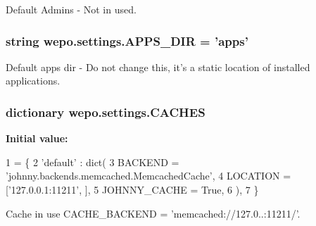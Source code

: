 Default Admins -\/ Not in used. 

\hypertarget{namespacewepo_1_1settings_aa72b0a269f252e5fd99fd29f6fa09db0}{
\subsubsection[{A\-P\-P\-S\-\_\-\-D\-I\-R}]{\setlength{\rightskip}{0pt plus 5cm}string wepo.\-settings.\-A\-P\-P\-S\-\_\-\-D\-I\-R = 'apps'}}\label{namespacewepo_1_1settings_aa72b0a269f252e5fd99fd29f6fa09db0}


Default apps dir -\/ Do not change this, it's a static location of installed applications. 

\hypertarget{namespacewepo_1_1settings_a153ec0e290d7467e4de29f825a3dbe81}{
\subsubsection[{C\-A\-C\-H\-E\-S}]{\setlength{\rightskip}{0pt plus 5cm}dictionary wepo.\-settings.\-C\-A\-C\-H\-E\-S}}\label{namespacewepo_1_1settings_a153ec0e290d7467e4de29f825a3dbe81}
{\bfseries Initial value\-:}
\begin{DoxyCode}
1 = \{
2    \textcolor{stringliteral}{'default'} : dict(
3       BACKEND = \textcolor{stringliteral}{'johnny.backends.memcached.MemcachedCache'},
4       LOCATION = [\textcolor{stringliteral}{'127.0.0.1:11211'}, ],
5       JOHNNY\_CACHE = \textcolor{keyword}{True},
6    ),
7 \}
\end{DoxyCode}


Cache in use C\-A\-C\-H\-E\-\_\-\-B\-A\-C\-K\-E\-N\-D = 'memcached\-://127.0..\-:11211/'. 

